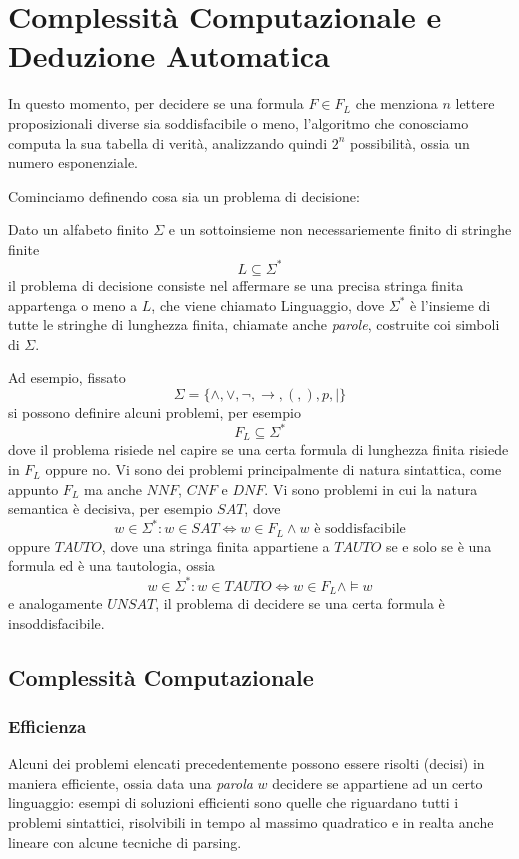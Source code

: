 \chapter{Complessità Computazionale e Deduzione Automatica}

In questo momento, per decidere se una formula $F \in F_L$ che menziona $n$ lettere 
proposizionali diverse sia soddisfacibile o meno, l'algoritmo che conosciamo
computa la sua tabella di verità, analizzando quindi $2^n$ possibilità, ossia 
un numero esponenziale. 

Cominciamo definendo cosa sia un problema di 
decisione:
\begin{defi}
 Dato un alfabeto finito $\Sigma$ e un sottoinsieme non necessariemente 
 finito di stringhe finite  
  $$
 L \subseteq \Sigma^* 
 $$
 il problema di decisione consiste nel affermare se una precisa 
 stringa finita appartenga o meno a $L$, che viene chiamato Linguaggio, 
dove $\Sigma^*$ è l'insieme di tutte le stringhe di lunghezza finita, 
chiamate anche \textit{parole}, costruite 
coi simboli di $\Sigma$. 
\end{defi}

Ad esempio, fissato 
$$
\Sigma = \{\land, \lor, \neg, \rightarrow, (, ), p, |\}
$$
si possono definire alcuni problemi, per esempio
$$
F_L \subseteq \Sigma ^*
$$
dove il problema risiede nel capire se una certa formula di lunghezza finita
risiede in $F_L$ oppure no. 
Vi sono dei problemi principalmente di natura sintattica, come appunto $F_L$ 
ma anche $NNF$, $CNF$ e $DNF$. Vi sono problemi in cui la natura semantica 
è decisiva, per esempio $SAT$, dove 
$$
w \in \Sigma^* : w\in SAT \iff w \in F_L \land w \text{ è soddisfacibile}
$$
oppure $TAUTO$, dove una stringa finita appartiene a $TAUTO$ se e solo se 
è una formula ed è una tautologia, ossia
$$
w \in \Sigma^* : w \in TAUTO \iff w \in F_L \land \models w
$$
e analogamente $UNSAT$, il problema di decidere se una certa formula è
insoddisfacibile.

\section{Complessità Computazionale}
\subsection{Efficienza}
Alcuni dei problemi elencati precedentemente possono essere risolti (decisi) 
in maniera efficiente, ossia data una \textit{parola} $w$ decidere se 
appartiene ad un certo linguaggio: esempi di soluzioni efficienti sono 
quelle che riguardano tutti i problemi sintattici, risolvibili in tempo 
al massimo quadratico e in realta anche lineare con alcune tecniche di parsing. 


